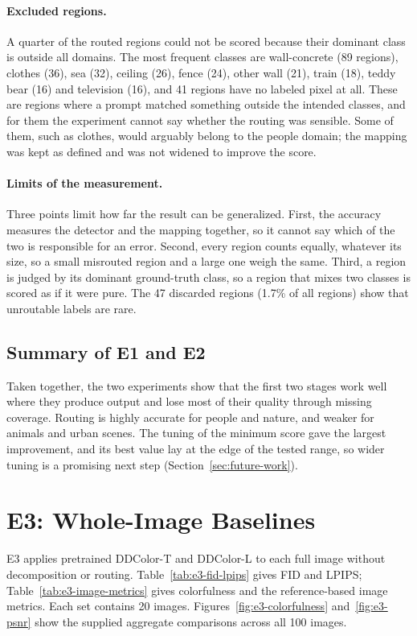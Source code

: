 \documentclass{FastFyp}
\begin{document}
\paragraph{Excluded regions.} A quarter of the routed regions could not be scored because their dominant class is outside all domains. The most frequent classes are wall-concrete (89 regions), clothes (36), sea (32), ceiling (26), fence (24), other wall (21), train (18), teddy bear (16) and television (16), and 41 regions have no labeled pixel at all. These are regions where a prompt matched something outside the intended classes, and for them the experiment cannot say whether the routing was sensible. Some of them, such as clothes, would arguably belong to the people domain; the mapping was kept as defined and was not widened to improve the score.
 
\paragraph{Limits of the measurement.} Three points limit how far the result can be generalized. First, the accuracy measures the detector and the mapping together, so it cannot say which of the two is responsible for an error. Second, every region counts equally, whatever its size, so a small misrouted region and a large one weigh the same. Third, a region is judged by its dominant ground-truth class, so a region that mixes two classes is scored as if it were pure. The 47 discarded regions (1.7\% of all regions) show that unroutable labels are rare.
 
\subsection{Summary of E1 and E2}
Taken together, the two experiments show that the first two stages work well where they produce output and lose most of their quality through missing coverage. Routing is highly accurate for people and nature, and weaker for animals and urban scenes. The tuning of the minimum score gave the largest improvement, and its best value lay at the edge of the tested range, so wider tuning is a promising next step (Section~\ref{sec:future-work}).


\section{E3: Whole-Image Baselines}
\label{sec:e3-baselines}

E3 applies pretrained DDColor-T and DDColor-L to each full image without
decomposition or routing. Table~\ref{tab:e3-fid-lpips} gives FID and LPIPS;
Table~\ref{tab:e3-image-metrics} gives colorfulness and the reference-based
image metrics. Each set contains 20 images. Figures~\ref{fig:e3-colorfulness}
and~\ref{fig:e3-psnr} show the supplied aggregate comparisons across all 100
images.
\end{document}
